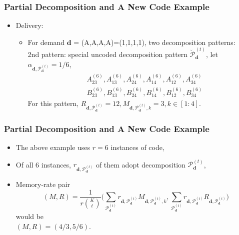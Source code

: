 \documentclass{beamer}
\begin{document}
\begin{frame}
\frametitle{Partial Decomposition and A New Code Example}
\begin{itemize}
\item Delivery:
	\begin{itemize}
	[circle]
	\item For demand $\boldsymbol{d}$ = (A,A,A,A)=(1,1,1,1), two decomposition patterns: \\
	2nd pattern: special uncoded decomposition pattern $\breve{\boldsymbol{\mathcal{P}}}_{\boldsymbol{d}}^{(t)}$, let $\alpha_{\boldsymbol{d},\boldsymbol{\mathcal{P}}_{\boldsymbol{d}}^{(t)}}=1/6$,
	\begin{align*}
	& A_{23}^{(6)}, A_{13}^{(6)}, A_{24}^{(6)}, A_{14}^{(6)}, A_{12}^{(6)}, A_{34}^{(6)} \\
	& B_{23}^{(6)}, B_{13}^{(6)}, B_{24}^{(6)}, B_{14}^{(6)}, B_{12}^{(6)}, B_{34}^{(6)} 
	\end{align*}
	For this pattern, $R_{\boldsymbol{d},\boldsymbol{\mathcal{P}}_{\boldsymbol{d}}^{(t)}} = 12, M_{\boldsymbol{d},\boldsymbol{\mathcal{P}}_{\boldsymbol{d}}^{(t)},k} = 3, k \in [1:4].$
	\end{itemize}
\end{itemize}
\end{frame}

\begin{frame}
\frametitle{Partial Decomposition and A New Code Example}
\begin{itemize}
\item The above example uses $r=6$ instances of code,
\item Of all 6 instances, $r_{\boldsymbol{d},\boldsymbol{\mathcal{P}}_{\boldsymbol{d}}^{(t)}}$ of them adopt decomposition $\boldsymbol{\mathcal{P}}_{\boldsymbol{d}}^{(t)}$, 
\item Memory-rate pair 
\begin{equation*}
(M,R)=\frac{1}{r\binom{K}{t}} \Bigg( \sum_{\boldsymbol{\mathcal{P}}_{\boldsymbol{d}}^{(t)}} r_{\boldsymbol{d},\boldsymbol{\mathcal{P}}_{\boldsymbol{d}}^{(t)}} M_{\boldsymbol{d},\boldsymbol{\mathcal{P}}_{\boldsymbol{d}}^{(t)},k}, \sum_{\boldsymbol{\mathcal{P}}_{\boldsymbol{d}}^{(t)}} r_{\boldsymbol{d},\boldsymbol{\mathcal{P}}_{\boldsymbol{d}}^{(t)}} R_{\boldsymbol{d},\boldsymbol{\mathcal{P}}_{\boldsymbol{d}}^{(t)}} \Bigg)
\end{equation*}
would be \\
\centering 
$(M,R)=(4/3, 5/6)$.
\end{itemize}
\end{frame}
\end{document}
